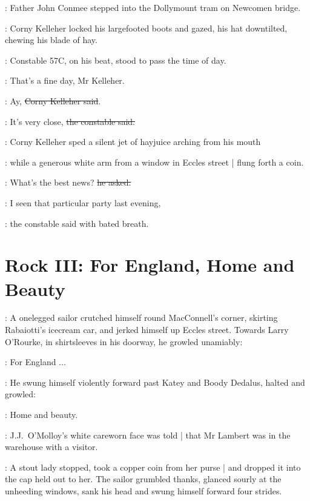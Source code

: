 \begin{mdframed}
    :
    Father John Conmee stepped into the Dollymount tram on Newcomen bridge.
\end{mdframed}

:
Corny Kelleher locked his largefooted boots and gazed,
his hat downtilted,
chewing his blade of hay.

:
Constable 57C,
on his beat,
stood to pass the time of day.

\constable:
That's a fine day, Mr Kelleher.

\corny:
Ay, \sout{Corny Kelleher said}.

\constable:
It's very close,
\sout{the constable said.}

:
Corny Kelleher sped a silent jet of hayjuice arching from his mouth

\begin{mdframed}
    :
    while a generous white arm from a window in Eccles street |
    flung forth a coin.
\end{mdframed}

\corny:
What's the best news? \sout{he asked.}

\constable:
I seen that particular party last evening,

:
the constable said with bated breath.


\section*{Rock III: For England, Home and Beauty}

:
A onelegged sailor crutched himself round MacConnell's corner,
skirting Rabaiotti's icecream car,
and jerked himself up Eccles street.
Towards Larry O'Rourke,
in shirtsleeves in his doorway,
he growled unamiably:

\sailor:
For England ...

:
He swung himself violently forward past Katey and Boody Dedalus,
halted and growled:

\sailor:
Home and beauty.

\begin{mdframed}
    :
    J.J.~O'Molloy's white careworn face was told |
    that Mr Lambert was in the warehouse with a visitor.
\end{mdframed}

:
A stout lady stopped,
took a copper coin from her purse |
and dropped it into the cap held out to her.
The sailor grumbled thanks,
glanced sourly at the unheeding windows,
sank his head
and swung himself forward four strides.

